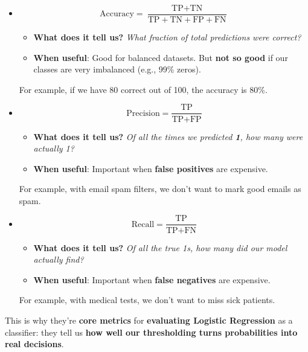 \begin{itemize}
    \item {}
    \begin{equation}
        \text{Accuracy} = \dfrac{\text{TP} + \text{TN}}{\text{TP} + \text{TN} + \text{FP} + \text{FN}}
    \end{equation}
    \begin{itemize}
        \item[\textcolor{Green3}{\faIcon{question-circle}}] \textcolor{Green3}{\textbf{What does it tell us?}} \emph{What fraction of total predictions were correct?}
        \item[\textcolor{Green3}{\faIcon{check-circle}}] \textcolor{Green3}{\textbf{When useful}}: Good for balanced datasets. But \textbf{not so good} if our classes are very imbalanced (e.g., 99\% zeros).
    \end{itemize}
    For example, if we have 80 correct out of 100, the accuracy is 80\%.
    
    \item {}
    \begin{equation}
        \text{Precision} = \dfrac{\text{TP}}{\text{TP} + \text{FP}}
    \end{equation}
    \begin{itemize}
        \item[\textcolor{Green3}{\faIcon{question-circle}}] \textcolor{Green3}{\textbf{What does it tell us?}} \emph{Of all the times we predicted \textbf{1}, how many were actually 1?}
        \item[\textcolor{Green3}{\faIcon{check-circle}}] \textcolor{Green3}{\textbf{When useful}}: Important when \textbf{false positives} are expensive.
    \end{itemize}
    For example, with email spam filters, we don't want to mark good emails as spam.

    \item {}
    \begin{equation}
        \text{Recall} = \frac{\text{TP}}{\text{TP} + \text{FN}}
    \end{equation}
    \begin{itemize}
        \item[\textcolor{Green3}{\faIcon{question-circle}}] \textcolor{Green3}{\textbf{What does it tell us?}} \emph{Of all the true 1s, how many did our model actually find?}
        \item[\textcolor{Green3}{\faIcon{check-circle}}] \textcolor{Green3}{\textbf{When useful}}: Important when \textbf{false negatives} are expensive.
    \end{itemize}
    For example, with medical tests, we don't want to miss sick patients.
\end{itemize}
This is why they're \textbf{core metrics} for \textbf{evaluating Logistic Regression} as a classifier: they tell us \textbf{how well our thresholding turns probabilities into real decisions}.


